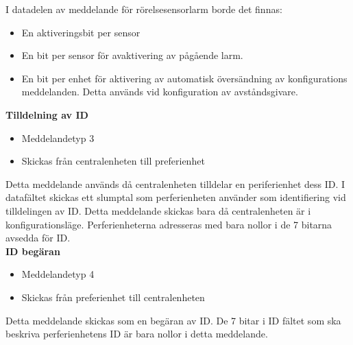 I datadelen av meddelande för rörelsesensorlarm borde det finnas:
\begin{itemize}
	\item En aktiveringsbit per sensor
	\item En bit per sensor för avaktivering av pågående larm.
	\item En bit per enhet för aktivering av automatisk översändning av konfigurations meddelanden. Detta används vid konfiguration av avståndsgivare.
\end{itemize}


\textbf{Tilldelning av ID}
\begin{itemize}
    \item Meddelandetyp 3
    \item Skickas från centralenheten till preferienhet
\end{itemize}
Detta meddelande används då centralenheten tilldelar en periferienhet dess ID. I datafältet skickas ett slumptal som perferienheten använder som identifiering vid tilldelingen av ID. Detta meddelande skickas bara då centralenheten är i konfigurationsläge. Perferienheterna adresseras med bara nollor i de 7 bitarna avsedda för ID. \\


\textbf{ID begäran}
\begin{itemize}
    \item Meddelandetyp 4
    \item Skickas från preferienhet till centralenheten
\end{itemize}
Detta meddelande skickas som en begäran av ID. De 7 bitar i ID fältet som ska beskriva perferienhetens ID är bara nollor i detta meddelande.
